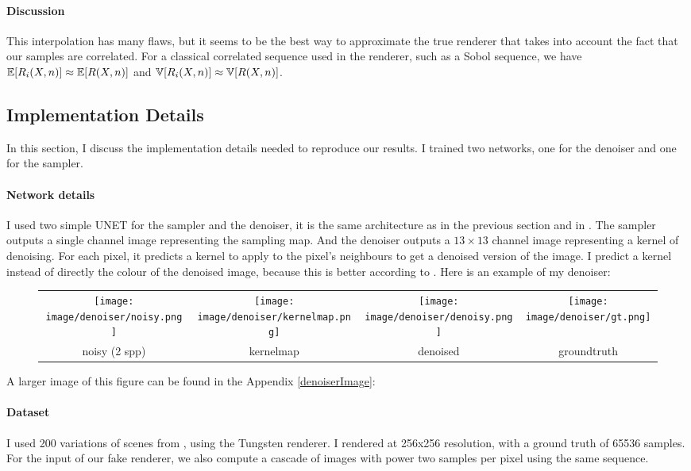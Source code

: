 \documentclass{classeENS}
\begin{document}
\paragraph*{Discussion} This interpolation has many flaws, but it seems to be the 
best way to approximate the true renderer that takes into account the fact that 
our samples are correlated. For a classical correlated sequence used in the 
renderer, such as a Sobol sequence, we have $\mathbb E[R_i(X,n)] \approx \mathbb E[R(X,n)]$ 
and $\mathbb V[R_i(X,n)] \approx \mathbb V[R(X,n)]$.

\subsection{Implementation Details}

In this section, I discuss the implementation details needed to reproduce 
our results. I trained two networks, one for the denoiser and one 
for the sampler.

\paragraph*{Network details} I used two simple UNET for the sampler and the denoiser, 
it is the same architecture as in the previous section and in \cite{kuznetsov2018deep}. 
The sampler outputs a single channel image representing the sampling map. And the denoiser 
outputs a $13\times13$ channel image representing a kernel of denoising. For each pixel, 
it predicts a kernel to apply to the pixel's neighbours to get a denoised version of the 
image. I predict a kernel instead of directly the colour of the denoised image, because 
this is better according to \cite{10.1145/3072959.3073708}. Here is an example of my 
denoiser:

\begin{figure}[H]
    \centering
    \begin{tabular}{cccc}
    \texttt{[image: image/denoiser/noisy.png]}
    & \texttt{[image: image/denoiser/kernelmap.png]}
    & \texttt{[image: image/denoiser/denoisy.png]}
    & \texttt{[image: image/denoiser/gt.png]} \\
    noisy (2 spp) & kernelmap & denoised & groundtruth \\
    \end{tabular}
\end{figure}
A larger image of this figure can be found in the Appendix \ref{denoiserImage}:

\paragraph*{Dataset} I used 200 variations of scenes from \cite{resources16}, using 
the Tungsten renderer. I rendered at 256x256 resolution, with a ground 
truth of 65536 samples. For the input of our fake renderer, we also 
compute a cascade of images with power two samples per pixel using the 
same sequence.
\end{document}
